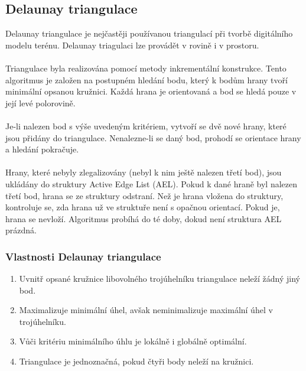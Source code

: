 \documentclass[a4paper, 12pt]{article}
\begin{document}
\subsection{Delaunay triangulace}
Delaunay triangulace je nejčastěji používanou triangulací při tvorbě digitálního modelu terénu. Delaunay triagulaci lze provádět v rovině i v prostoru.\\
\\
Triangulace byla realizována pomocí metody inkrementální konstrukce. Tento algoritmus je založen na postupném hledání bodu, který k bodům hrany tvoří minimální opsanou kružnici. Každá hrana je orientovaná a bod se hledá pouze v její levé polorovině.\\
\\
Je-li nalezen bod s výše uvedeným kritériem, vytvoří se dvě nové hrany, které jsou přidány do triangulace. Nenalezne-li se daný bod, prohodí se orientace hrany a hledání pokračuje.\\
\\
Hrany, které nebyly zlegalizovány (nebyl k nim ještě nalezen třetí bod), jsou ukládány do struktury Active Edge List (AEL). Pokud k dané hraně byl nalezen třetí bod, hrana se ze struktury odstraní. Než je hrana vložena do struktury, kontroluje se, zda hrana už ve struktuře není s opačnou orientací. Pokud je, hrana se nevloží. Algoritmus probíhá do té doby, dokud není struktura AEL prázdná.

\subsubsection{Vlastnosti Delaunay triangulace}

\begin{enumerate}
\item Uvnitř opsané kružnice libovolného trojúhelníku triangulace neleží žádný jiný bod.
\item Maximalizuje minimální úhel, avšak neminimalizuje maximální úhel v trojúhelníku.
\item Vůči kritériu minimálního úhlu je lokálně i globálně optimální.
\item Triangulace je jednoznačná, pokud čtyři body neleží na kružnici.
\end{enumerate}
\end{document}
